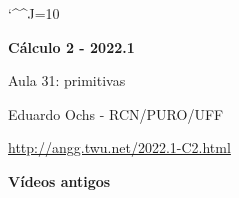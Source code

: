 \documentclass[oneside,12pt]{article}
\begin{document}
\catcode`\^^J=10
\pu
\def\pictgridstyle{\color{GrayPale}\linethickness{0.3pt}}
\def\pictaxesstyle{\linethickness{0.5pt}}
\celllower=2.5pt


\def\u#1{\par{\footnotesize \url{#1}}}

\def\drafturl{http://angg.twu.net/LATEX/2022-1-C2.pdf}
\def\drafturl{http://angg.twu.net/2022.1-C2.html}
\def\draftfooter{\tiny \href{\drafturl}{\jobname{}} \ColorBrown{\shorttoday{} \hours}}

\def\domc{\text{domc}}


%

\thispagestyle{empty}

\begin{center}

\vspace*{1.2cm}

{\bf \Large Cálculo 2 - 2022.1}

\bsk

Aula 31: primitivas

\bsk

Eduardo Ochs - RCN/PURO/UFF

\url{http://angg.twu.net/2022.1-C2.html}

\end{center}

\newpage


{\bf Vídeos antigos}
\end{document}

